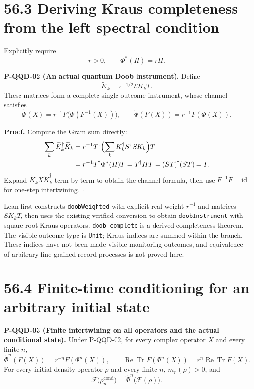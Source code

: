 \documentclass[
  11pt,
  oneside]{book}
\begin{document}
\section{56.3 Deriving Kraus completeness from the left spectral
condition}

Explicitly require \[
r>0,\qquad \Phi^*(H)=rH.
\]

\label{p-qqd-02}{}

\textbf{P-QQD-02 (An actual quantum Doob instrument).} Define \[
\widetilde K_k=r^{-1/2}SK_kT.
\] These matrices form a complete single-outcome instrument, whose
channel satisfies \[
\widetilde\Phi(X)=r^{-1}F\bigl(\Phi(F^{-1}(X))\bigr),
\qquad \widetilde\Phi(F(X))=r^{-1}F(\Phi(X)).
\]

\textbf{Proof.} Compute the Gram sum directly: \[
\begin{aligned}
\sum_k\widetilde K_k^\dagger\widetilde K_k
&=r^{-1}T^\dagger\Bigl(\sum_kK_k^\dagger S^\dagger SK_k\Bigr)T\\
&=r^{-1}T^\dagger\Phi^*(H)T
=T^\dagger HT=(ST)^\dagger(ST)=I.
\end{aligned}
\] Expand \(\widetilde K_kX\widetilde K_k^\dagger\) term by term to
obtain the channel formula, then use \(F^{-1}F=\mathrm{id}\) for
one-step intertwining. \(\square\)

Lean first constructs \texttt{doob\allowbreak Weighted} with explicit real weight
\(r^{-1}\) and matrices \(SK_kT\), then uses the existing verified
conversion to obtain \texttt{doob\allowbreak Instrument} with square-root Kraus
operators. \texttt{doob\_\allowbreak complete} is a derived completeness theorem.
The visible outcome type is \texttt{Unit}; Kraus indices are summed
within the branch. These indices have not been made visible monitoring
outcomes, and equivalence of arbitrary fine-grained record processes is
not proved here.

\section{56.4 Finite-time conditioning for an arbitrary initial state}

\label{p-qqd-03}{}

\textbf{P-QQD-03 (Finite intertwining on all operators and the actual
conditional state).} Under P-QQD-02, for every complex operator \(X\)
and every finite \(n\), \[
\widetilde\Phi^n(F(X))=r^{-n}F(\Phi^n(X)),
\qquad \operatorname{Re}\operatorname{Tr}F(\Phi^n(X))=r^n\operatorname{Re}\operatorname{Tr}F(X).
\] For every initial density operator \(\rho\) and every finite \(n\),
\(m_n(\rho)>0\), and \[
\mathcal F\bigl(\rho_n^{\mathrm{cond}}\bigr)
=\widetilde\Phi^n\bigl(\mathcal F(\rho)\bigr).
\]
\end{document}
